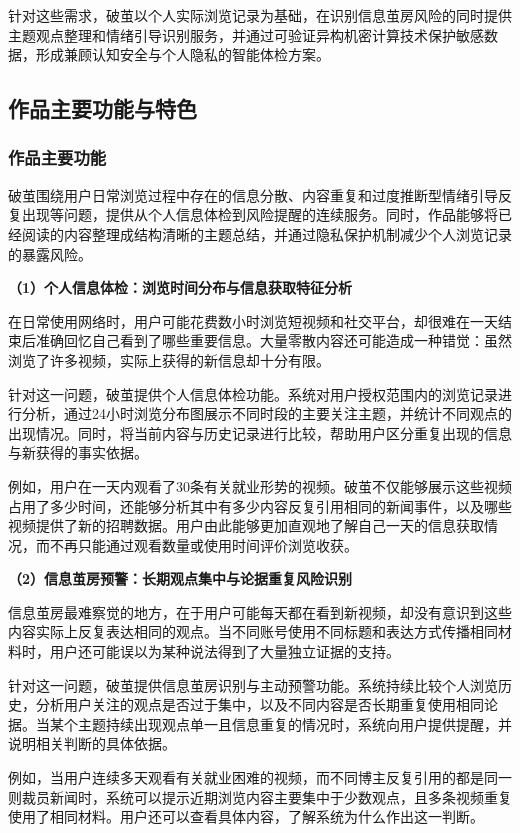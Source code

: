 针对这些需求，破茧以个人实际浏览记录为基础，在识别信息茧房风险的同时提供主题观点整理和情绪引导识别服务，并通过可验证异构机密计算技术保护敏感数据，形成兼顾认知安全与个人隐私的智能体检方案。

\subsection{作品主要功能与特色}\label{section:1.4}

\subsubsection{作品主要功能}\label{section:1.4.1}

破茧围绕用户日常浏览过程中存在的信息分散、内容重复和过度推断型情绪引导反复出现等问题，提供从个人信息体检到风险提醒的连续服务。同时，作品能够将已经阅读的内容整理成结构清晰的主题总结，并通过隐私保护机制减少个人浏览记录的暴露风险。

\textbf{（1）个人信息体检：浏览时间分布与信息获取特征分析}

在日常使用网络时，用户可能花费数小时浏览短视频和社交平台，却很难在一天结束后准确回忆自己看到了哪些重要信息。大量零散内容还可能造成一种错觉：虽然浏览了许多视频，实际上获得的新信息却十分有限。

针对这一问题，破茧提供个人信息体检功能。系统对用户授权范围内的浏览记录进行分析，通过24小时浏览分布图展示不同时段的主要关注主题，并统计不同观点的出现情况。同时，将当前内容与历史记录进行比较，帮助用户区分重复出现的信息与新获得的事实依据。

例如，用户在一天内观看了30条有关就业形势的视频。破茧不仅能够展示这些视频占用了多少时间，还能够分析其中有多少内容反复引用相同的新闻事件，以及哪些视频提供了新的招聘数据。用户由此能够更加直观地了解自己一天的信息获取情况，而不再只能通过观看数量或使用时间评价浏览收获。

\textbf{（2）信息茧房预警：长期观点集中与论据重复风险识别}

信息茧房最难察觉的地方，在于用户可能每天都在看到新视频，却没有意识到这些内容实际上反复表达相同的观点。当不同账号使用不同标题和表达方式传播相同材料时，用户还可能误以为某种说法得到了大量独立证据的支持。

针对这一问题，破茧提供信息茧房识别与主动预警功能。系统持续比较个人浏览历史，分析用户关注的观点是否过于集中，以及不同内容是否长期重复使用相同论据。当某个主题持续出现观点单一且信息重复的情况时，系统向用户提供提醒，并说明相关判断的具体依据。

例如，当用户连续多天观看有关就业困难的视频，而不同博主反复引用的都是同一则裁员新闻时，系统可以提示近期浏览内容主要集中于少数观点，且多条视频重复使用了相同材料。用户还可以查看具体内容，了解系统为什么作出这一判断。

